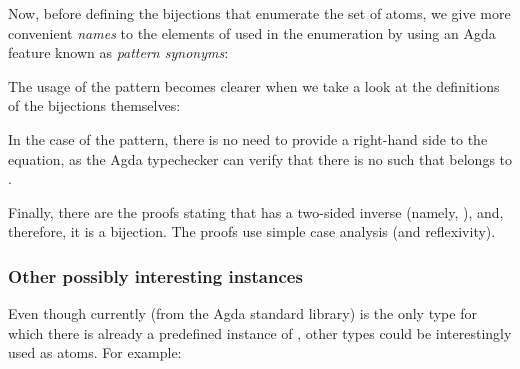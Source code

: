             \begin{center}
            \end{center}

            Now, before defining the bijections that enumerate the set of atoms,
            we give more convenient \emph{names} to the elements of   used in the enumeration
            by using an Agda feature known as \emph{pattern synonyms}:

            \begin{center}
            \end{center}

            The usage of the  pattern becomes clearer when we take a look at
            the definitions of the bijections themselves:

            \begin{center}
            \end{center}

            In the case of the  pattern, there is no need to provide a right-hand side
            to the equation, as the Agda typechecker can verify that
            there is no  such that  \AY{(} \AY{)} belongs to  .

            Finally, there are the proofs stating that  has a two-sided inverse (namely, ),
            and, therefore, it is a bijection. The proofs use simple case analysis (and reflexivity).

            \begin{center}
            \end{center}

            \subsubsection{Other possibly interesting instances}
            \label{subsubsec:atomic-other}
            Even though currently  (from the Agda standard library) is the only type for which
            there is already a predefined instance of , other types could be interestingly used as atoms.
            For example:

